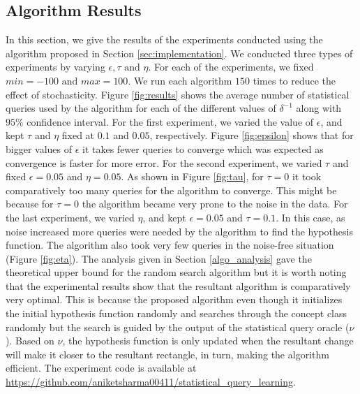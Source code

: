 \subsection{Algorithm Results}
\label{app:algo_analysis}
In this section, we give the results of the experiments conducted using the algorithm proposed in Section \ref{sec:implementation}. We conducted three types of experiments by varying $\epsilon, \tau \text{ and } \eta$. For each of the experiments, we fixed $min=-100 \text{ and } max=100$. We run each algorithm $150$ times to reduce the effect of stochasticity. Figure \ref{fig:results} shows the average number of statistical queries used by the algorithm for each of the different values of $\delta^{-1}$ along with $95\%$ confidence interval. For the first experiment, we varied the value of $\epsilon$, and kept $\tau$ and $\eta$ fixed at $0.1$ and $0.05$, respectively. Figure \ref{fig:epsilon} shows that for bigger values of $\epsilon$ it takes fewer queries to converge which was expected as convergence is faster for more error. For the second experiment, we varied $\tau$ and fixed $\epsilon=0.05$ and $\eta=0.05$. As shown in Figure \ref{fig:tau}, for $\tau=0$ it took comparatively too many queries for the algorithm to converge. This might be because for $\tau=0$ the algorithm became very prone to the noise in the data. For the last experiment, we varied $\eta$, and kept $\epsilon=0.05$ and $\tau=0.1$. In this case, as noise increased more queries were needed by the algorithm to find the hypothesis function. The algorithm also took very few queries in the noise-free situation (Figure \ref{fig:eta}). The analysis given in Section \ref{algo_analysis} gave the theoretical upper bound for the random search algorithm but it is worth noting that the experimental results show that the resultant algorithm is comparatively very optimal. This is because the proposed algorithm even though it initializes the initial hypothesis function randomly and searches through the concept class randomly but the search is guided by the output of the statistical query oracle ($\nu$). Based on $\nu$, the hypothesis function is only updated when the resultant change will make it closer to the resultant rectangle, in turn, making the algorithm efficient. The experiment code is available at \url{https://github.com/aniketsharma00411/statistical_query_learning}.

